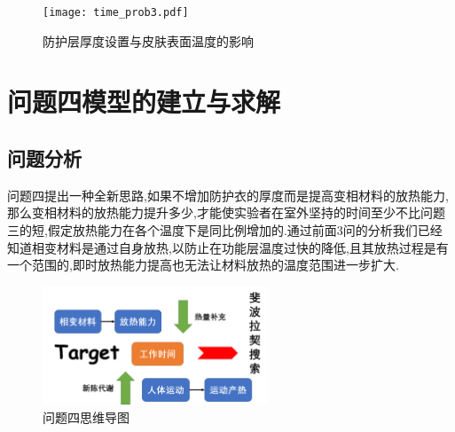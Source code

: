 \documentclass{whutmod}
\begin{document}

\begin{figure}[!htbp]
	\centering
	\texttt{[image: time\_prob3.pdf]}
	\caption{防护层厚度设置与皮肤表面温度的影响}
\end{figure} 


\section{问题四模型的建立与求解}
\subsection{问题分析}
问题四提出一种全新思路,如果不增加防护衣的厚度而是提高变相材料的放热能力,那么变相材料的放热能力提升多少,才能使实验者在室外坚持的时间至少不比问题三的短,假定放热能力在各个温度下是同比例增加的.通过前面3问的分析我们已经知道相变材料是通过自身放热,以防止在功能层温度过快的降低,且其放热过程是有一个范围的,即时放热能力提高也无法让材料放热的温度范围进一步扩大.
\begin{figure}[!htbp]
	\centering
	\includegraphics[width=0.6\textwidth]{map4.png}
	\caption{问题四思维导图}
\end{figure} 
\end{document}
